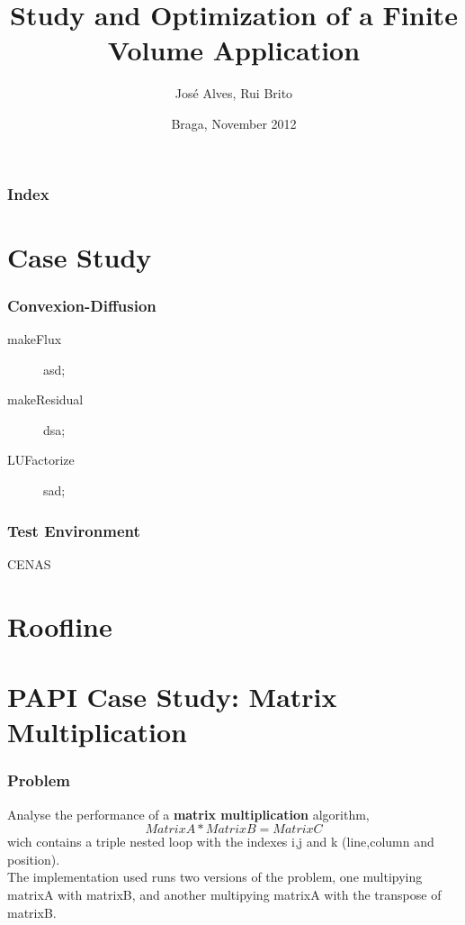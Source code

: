 \documentclass{beamer}
\title{Study and Optimization of a Finite Volume Application}
\author{José Alves, Rui Brito}
\institute[pg22765, pg22781]{
	Universidade do Minho
}
\date{Braga, November 2012}
\begin{document}

\maketitle%

\begin{frame}
	\frametitle{Index}
	\tableofcontents
\end{frame}

\section{Case Study}

\begin{frame}[plain]
	\frametitle{Convexion-Diffusion}
	\begin{description}
		\item [makeFlux] asd;
		\item [makeResidual] dsa;
		\item [LUFactorize] sad;
	\end{description}
\end{frame}

\begin{frame}
	\frametitle{Test Environment}
	CENAS
\end{frame}



\section{Roofline}
\begin{frame}
	\begin{figure}[!htp]
		\label{fig:roofline}
		\end{figure}
\end{frame}

\section{PAPI Case Study: Matrix Multiplication}
\begin{frame}%
	\frametitle{Problem}

	Analyse the performance of a \textbf{matrix multiplication} algorithm, \begin{equation}Matrix A * Matrix B = Matrix C\end{equation} wich contains a triple nested loop with the indexes i,j and k (line,column and position).\\

	The implementation used runs two versions of the problem, one multipying matrixA with matrixB, and another multipying matrixA with the transpose of matrixB.
\end{frame}%
\end{document}
